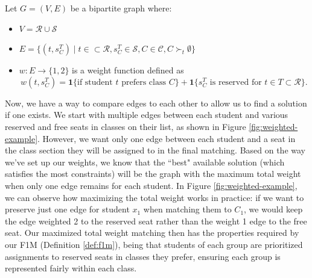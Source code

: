 \begin{definition}
  \label{weighted-def}
  Let $G = (V, E)$ be a bipartite graph where:
  \begin{itemize}
    \item
           $V = \mathcal{R} \cup \mathcal{S}$
    \item
          $E = \{(t, s_C^T) \mid t \in \subset \mathcal{R}, s_C^T \in \mathcal{S}, C \in
        \mathcal{C}, C \succ_t
            \emptyset\}$
    \item
          $w : E \rightarrow \{1 , 2 \} $ is a weight function
          defined as \[ w(t, s_C^T) = \mathbf{1}\{\text{if student $t$ prefers class
          $C$}\} + \mathbf{1}\{\text{$s_C^T$ is reserved for $t \in T \subset
        \mathcal{R}$}\}. \]
  \end{itemize}
\end{definition}

Now, we have a way to compare edges to each other to allow us to find a
solution if one exists. We start with multiple edges between each student and
various reserved and free seats in classes on their list, as shown in Figure \ref{fig:weighted-example}. However, we want only
one edge between each student and a seat in the class section they will be
assigned to in the final matching. Based on the way we've set up our weights, we know that
the ``best" available solution (which satisfies the most constraints) will be the
graph with the maximum total weight when
only one edge remains for each student. In Figure
\ref{fig:weighted-example}, we can observe how maximizing the total weight works
in practice: if we want to preserve just one edge for student $x_1$ when
matching them to $C_1$, we would keep the edge weighted 2 to the reserved seat
rather than the weight 1 edge to the free seat. Our maximized total weight matching then has the
properties required by our F1M (Definition \ref{def:f1m}), being that students of each group
are prioritized assignments to reserved seats in classes they prefer, ensuring each
group is represented fairly within each class.


